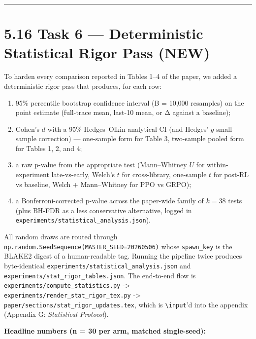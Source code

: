 \documentclass[
  american,
  11pt,
  a4paper,
  oneside]{report}
\providecommand{\tightlist}{%
  \setlength{\itemsep}{0pt}\setlength{\parskip}{0pt}}
\begin{document}
\begin{center}\rule{0.5\linewidth}{0.5pt}\end{center}

\section{5.16 Task 6 --- Deterministic Statistical Rigor Pass
(NEW)}\label{task-6-deterministic-statistical-rigor-pass-new}

To harden every comparison reported in Tables 1--4 of the paper, we
added a deterministic rigor pass that produces, for each row:

\begin{enumerate}
\def\labelenumi{\arabic{enumi}.}
\tightlist
\item
  95\% percentile bootstrap confidence interval (B = 10,000 resamples)
  on the point estimate (full-trace mean, last-10 mean, or Δ against a
  baseline);
\item
  Cohen's \(d\) with a 95\% Hedges--Olkin analytical CI (and Hedges'
  \(g\) small-sample correction) --- one-sample form for Table 3,
  two-sample pooled form for Tables 1, 2, and 4;
\item
  a raw p-value from the appropriate test (Mann--Whitney \(U\) for
  within-experiment late-vs-early, Welch's \(t\) for cross-library,
  one-sample \(t\) for post-RL vs baseline, Welch + Mann--Whitney for
  PPO vs GRPO);
\item
  a Bonferroni-corrected p-value across the paper-wide family of
  \(k = 38\) tests (plus BH-FDR as a less conservative alternative,
  logged in \texttt{experiments/statistical\_analysis.json}).
\end{enumerate}

All random draws are routed through
\texttt{np.random.SeedSequence(MASTER\_SEED=20260506)} whose
\texttt{spawn\_key} is the BLAKE2 digest of a human-readable tag.
Running the pipeline twice produces byte-identical
\texttt{experiments/statistical\_analysis.json} and
\texttt{experiments/stat\_rigor\_tables.json}. The end-to-end flow is
\texttt{experiments/compute\_statistics.py} -\textgreater{}
\texttt{experiments/render\_stat\_rigor\_tex.py} -\textgreater{}
\texttt{paper/sections/stat\_rigor\_updates.tex}, which is
\texttt{\textbackslash{}input}'d into the appendix (Appendix G:
\emph{Statistical Protocol}).

\textbf{Headline numbers (n = 30 per arm, matched single-seed):}
\end{document}
